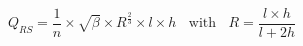 \begin{equation}
Q_{RS} = \frac{1}{n} \times \sqrt{\beta} \times R^\frac{2}{3} \times l \times h \ \ \ \ \text{with} \ \ \ \ R = \frac{l \times h}{l + 2h}
\end{equation}


